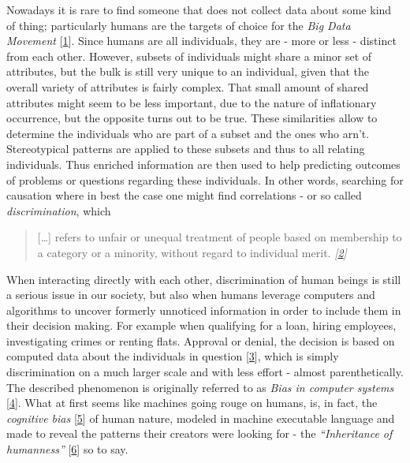 \documentclass[12pt,english,a4paper,titlepage,cleardoublepage=empty,dottedtoc]{report}
\begin{document}
Nowadays it is rare to find someone that does not collect data about
some kind of thing; particularly humans are the targets of choice for
the \emph{Big Data Movement}
{[}\protect\hyperlink{ref-web_2016_privacy-international-about-big-data}{1}{]}.
Since humans are all individuals, they are - more or less - distinct
from each other. However, subsets of individuals might share a minor set
of attributes, but the bulk is still very unique to an individual, given
that the overall variety of attributes is fairly complex. That small
amount of shared attributes might seem to be less important, due to the
nature of inflationary occurrence, but the opposite turns out to be
true. These similarities allow to determine the individuals who are part
of a subset and the ones who arn't. Stereotypical patterns are applied
to these subsets and thus to all relating individuals. Thus enriched
information are then used to help predicting outcomes of problems or
questions regarding these individuals. In other words, searching for
causation where in best the case one might find correlations - or so
called \emph{discrimination}, which

\begin{quote}
{[}\ldots{}{]} refers to unfair or unequal treatment of people based on
membership to a category or a minority, without regard to individual
merit.
\emph{{[}\protect\hyperlink{ref-paper_2008_discrimination-aware-data-mining}{2}{]}}
\end{quote}

When interacting directly with each other, discrimination of human
beings is still a serious issue in our society, but also when humans
leverage computers and algorithms to uncover formerly unnoticed
information in order to include them in their decision making. For
example when qualifying for a loan, hiring employees, investigating
crimes or renting flats. Approval or denial, the decision is based on
computed data about the individuals in question
{[}\protect\hyperlink{ref-book_2015_ethical-it-innovation_ethical-uses-of-information-and-knowledge}{3}{]},
which is simply discrimination on a much larger scale and with less
effort - almost parenthetically. The described phenomenon is originally
referred to as \emph{Bias in computer systems}
{[}\protect\hyperlink{ref-paper_1996_bias-in-computer-systems}{4}{]}.
What at first seems like machines going rouge on humans, is, in fact,
the \emph{cognitive bias}
{[}\protect\hyperlink{ref-wikipedia_2016_cognitive-bias}{5}{]} of human
nature, modeled in machine executable language and made to reveal the
patterns their creators were looking for - the \emph{``Inheritance of
humanness''}
{[}\protect\hyperlink{ref-web_2016_big-data-is-people}{6}{]} so to say.
\end{document}
